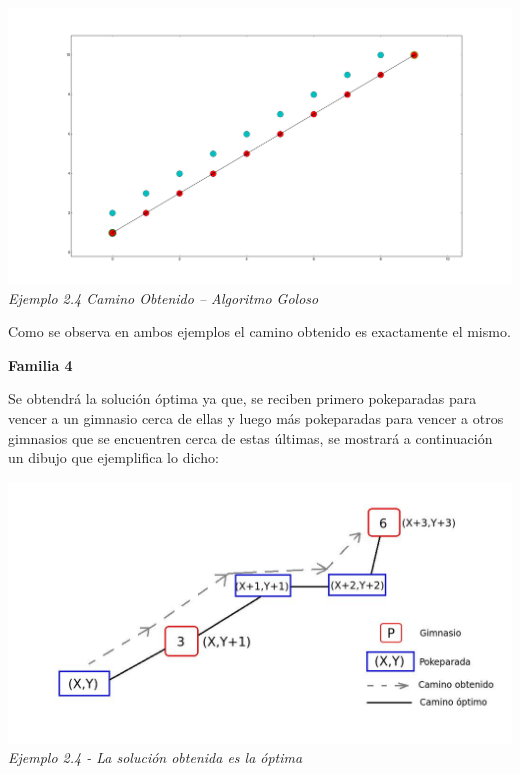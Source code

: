   \vspace*{0.3cm} \vspace*{0.3cm}
  \begin{center}
\includegraphics[scale=0.60]{./EJ2/grafotodos0.png}
\\{\textit{Ejemplo 2.4 Camino Obtenido -- Algoritmo Goloso}}
  \end{center}
  \vspace*{0.3cm}

Como se observa en ambos ejemplos el camino obtenido es exactamente el mismo.


\begin{center}
\textbf{Familia 4}
\end{center}

Se obtendr\'a la soluci\'on \'optima ya que, se reciben primero pokeparadas para vencer a un gimnasio cerca de ellas y luego m\'as pokeparadas para vencer a otros gimnasios que se encuentren cerca de estas \'ultimas, se mostrar\'a a continuaci\'on un dibujo que ejemplifica lo dicho:

\vspace*{0.3cm} \vspace*{0.3cm}
  \begin{center}
\includegraphics[scale=0.60]{./EJ2/optima.jpeg}
\\{\textit{Ejemplo 2.4 - La soluci\'on obtenida es la \'optima}}
  \end{center}
  \vspace*{0.3cm}

